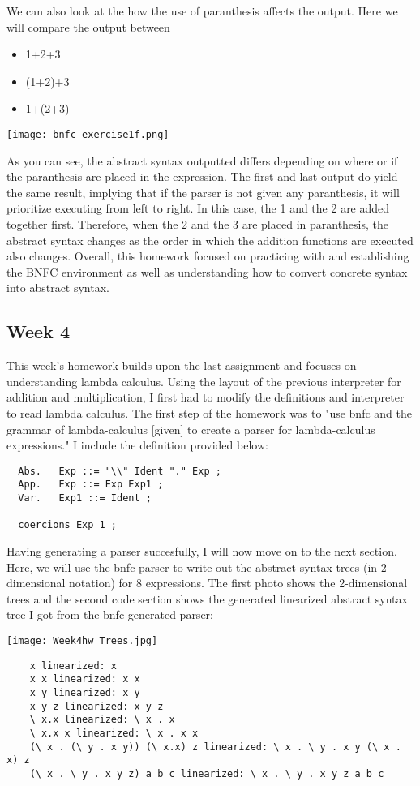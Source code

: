 \documentclass{article}
\theoremstyle{theorem}
\theoremstyle{definition}
\theoremstyle{remark}
\begin{document}
We can also look at the how the use of paranthesis affects the output. Here we will compare the output between 
\begin{itemize}
  \item 1+2+3
  \item (1+2)+3
  \item 1+(2+3)
\end{itemize}
\begin{center}
  \texttt{[image: bnfc\_exercise1f.png]}
\end{center}
As you can see, the abstract syntax outputted differs depending on where or if the paranthesis are placed in the expression. The first and last output do yield the same result, implying 
that if the parser is not given any paranthesis, it will prioritize executing from left to right. In this case, the 1 and the 2 are added together first. Therefore, when the 2 and the 3 are 
placed in paranthesis, the abstract syntax changes as the order in which the addition functions are executed also changes. Overall, this homework focused on practicing with and establishing the BNFC 
environment as well as understanding how to convert concrete syntax into abstract syntax. \\

\subsection{Week 4}
This week's homework builds upon the last assignment and focuses on understanding lambda calculus. Using the layout of the previous interpreter for addition and multiplication, I first had to 
modify the definitions and interpreter to read lambda calculus. The first step of the homework was to "use bnfc and the grammar of lambda-calculus [given] to create a parser for lambda-calculus expressions." 
I include the definition provided below: 
\begin{verbatim}
  Abs.   Exp ::= "\\" Ident "." Exp ;  
  App.   Exp ::= Exp Exp1 ; 
  Var.   Exp1 ::= Ident ;

  coercions Exp 1 ;
\end{verbatim}


Having generating a parser succesfully, I will now move on to the next section. Here, we will use the bnfc parser to write out the abstract syntax trees (in 2-dimensional notation) for 8 expressions. The first photo 
shows the 2-dimensional trees and the second code section shows the generated linearized abstract syntax tree I got from the bnfc-generated parser: 
\begin{center}
  \texttt{[image: Week4hw\_Trees.jpg]}
  \begin{verbatim}
    x linearized: x
    x x linearized: x x
    x y linearized: x y
    x y z linearized: x y z
    \ x.x linearized: \ x . x
    \ x.x x linearized: \ x . x x
    (\ x . (\ y . x y)) (\ x.x) z linearized: \ x . \ y . x y (\ x . x) z
    (\ x . \ y . x y z) a b c linearized: \ x . \ y . x y z a b c
  \end{verbatim}
\end{center}
\end{document}
